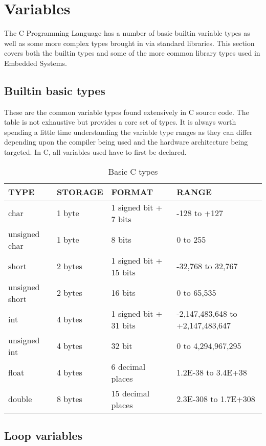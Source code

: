 \section{Variables} \label{avari}

The C Programming Language has a number of basic builtin variable types as well as some more complex types brought in via standard libraries. This section covers both the builtin types and some of the more common library types used in Embedded Systems. 

\subsection{Builtin basic types}

These are the common variable types found extensively in C source code. The table is not exhaustive but provides a core set of types. It is always worth spending a little time understanding the variable type ranges as they can differ depending upon the compiler being used and the hardware architecture being targeted. In C, all variables used have to first be declared.

\begin{table}[H]
  \centering
  \begin{tabular}{ | l | l | l | l |}
    \hline
    TYPE & STORAGE & FORMAT & RANGE \\ \hline
    char & 1 byte & 1 signed bit + 7 bits & -128 to +127 \\ \hline
    unsigned char & 1 byte & 8 bits & 0 to 255 \\ \hline
    short & 2 bytes & 1 signed bit + 15 bits & -32,768 to 32,767 \\ \hline
    unsigned short & 2 bytes & 16 bits & 0 to 65,535 \\ \hline
    int & 4 bytes & 1 signed bit + 31 bits & -2,147,483,648 to +2,147,483,647 \\ \hline
    unsigned int & 4 bytes & 32 bit & 0 to 4,294,967,295 \\ \hline
    float & 4 bytes & 6 decimal places & 1.2E-38 to 3.4E+38 \\ \hline
    double & 8 bytes & 15 decimal places & 2.3E-308 to 1.7E+308 \\ 
    \hline
  \end{tabular}
\caption{Basic C types}
\label{ctypes}
\end{table}

\subsection{Loop variables}

